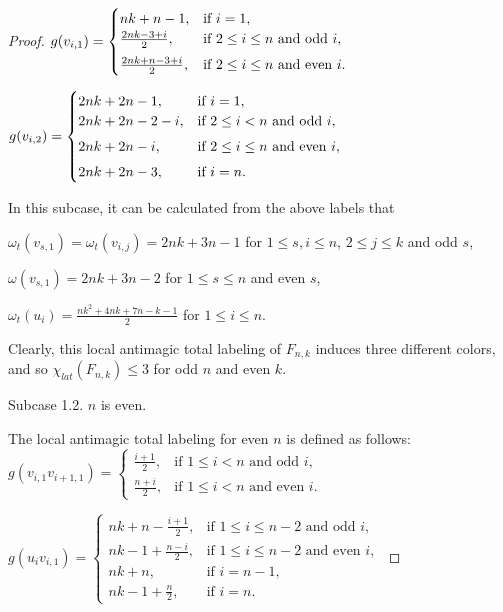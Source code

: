 \documentclass[12pt]{article}
\begin{document}
\begin{proof}
$g(v_{i,1})=\begin{cases}
nk+n-1, & \text{if $ i=1$},\\
\frac{2nk-3+i}{2}, & \text{if $2\leq i\leq n$ and odd $i$},\\[4pt]
\frac{2nk+n-3+i}{2}, &\text{if $2\leq i\leq n$ and even $i$}.\end{cases}$\vspace{0.5em}

$g(v_{i,2})=\begin{cases}
2nk+2n-1, & \text{if $ i=1$},\\
2nk+2n-2-i, & \text{if $2\leq i< n$ and odd $i$},\\[4pt]
2nk+2n-i,  &\text{if $2\leq i\leq n$ and even $i$},\\[4pt]
2nk+2n-3, & \text{if $ i=n$}.\end{cases}$\vspace{0.6em}

In this subcase, it can be calculated from the above labels that

$\omega_{t}(v_{s,1})=\omega_{t}(v_{i,j})=2nk+3n-1$ for $1\leq s,i\leq n$, $2\leq j\leq k$ and odd $s$,

$\omega(v_{s,1})=2nk+3n-2$ for $1\leq s\leq n$ and even $s$,

$\omega_{t}(u_{i})=\frac{nk^{2}+4nk+7n-k-1}{2}$ for $1\leq i\leq n$.

Clearly, this local antimagic total labeling of $F_{n,k}$ induces three different colors, and so $\chi_{lat}(F_{n,k})\leq 3$ for odd $n$ and even $k$.

Subcase 1.2.  $n$ is even.

The local antimagic total labeling for even $n$ is defined as follows:\\

\vspace{-0.8em}
$g(v_{i,1}v_{i+1,1})=\begin{cases}
                       \frac{i+1}{2}, & \text{if $1\leq i<n$ and odd $i$},\\[4pt]
                       \frac{n+i}{2}, & \text{if $1\leq i<n$ and even $i$}.\end{cases}$\vspace{0.5em}

$g(u_{i}v_{i,1})=\begin{cases}
nk+n-\frac{i+1}{2}, & \text{if $1\leq i\leq n-2$ and odd $i$},\\[4pt]
nk-1+\frac{n-i}{2}, & \text{if $1\leq i\leq n-2$ and even $i$},\\[4pt]
nk+n,     &\text{if }i=n-1,\\[4pt]
nk-1+\frac{n}{2}, &\text{if }i=n.\end{cases}$\vspace{0.4em}


\end{proof}
\end{document}
